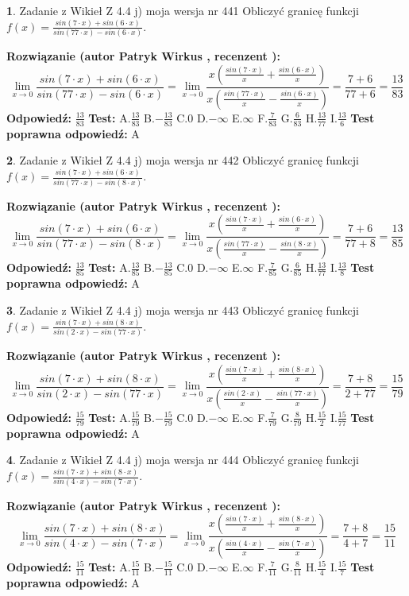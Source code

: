 \documentclass[12pt, a4paper]{article}
\theoremstyle{definition} %
\newtheorem{zad}{}
\newcommand{\zadStart}[1]{\begin{zad}#1\newline}
\newcommand{\zadStop}{\end{zad}}
\newcommand{\rozwStart}[2]{\noindent \textbf{Rozwiązanie (autor #1 , recenzent #2): }\newline}
\newcommand{\rozwStop}{\newline}
\newcommand{\odpStart}{\noindent \textbf{Odpowiedź:}\newline}
\newcommand{\odpStop}{\newline}
\newcommand{\testStart}{\noindent \textbf{Test:}\newline}
\newcommand{\testStop}{\newline}
\newcommand{\kluczStart}{\noindent \textbf{Test poprawna odpowiedź:}\newline}
\newcommand{\kluczStop}{\newline}
\begin{document}
\zadStart{Zadanie z Wikieł Z 4.4 j) moja wersja nr 441}
Obliczyć granicę funkcji $f(x)=\frac{sin(7\cdot x) +sin(6\cdot x)}{sin(77\cdot x) -sin(6\cdot x)}$.
\zadStop
\rozwStart{Patryk Wirkus}{}
$$\lim\limits_{x\to 0}\frac{sin(7\cdot x) +sin(6\cdot x)}{sin(77\cdot x) -sin(6\cdot x)}=\lim\limits_{x\to 0}\frac{x(\frac{sin(7\cdot x)}{x}+\frac{sin(6\cdot x)}{x})}{x(\frac{sin(77\cdot x)}{x}-\frac{sin(6\cdot x)}{x})}=\frac{7+6}{77+6} = \frac{13}{83}$$
\rozwStop
\odpStart
$\frac{13}{83}$
\odpStop
\testStart
A.$\frac{13}{83}$
B.$-\frac{13}{83}$
C.$0$
D.$-\infty$
E.$\infty$
F.$\frac{7}{83}$
G.$\frac{6}{83}$
H.$\frac{13}{77}$
I.$\frac{13}{6}$
\testStop
\kluczStart
A
\kluczStop



\zadStart{Zadanie z Wikieł Z 4.4 j) moja wersja nr 442}
Obliczyć granicę funkcji $f(x)=\frac{sin(7\cdot x) +sin(6\cdot x)}{sin(77\cdot x) -sin(8\cdot x)}$.
\zadStop
\rozwStart{Patryk Wirkus}{}
$$\lim\limits_{x\to 0}\frac{sin(7\cdot x) +sin(6\cdot x)}{sin(77\cdot x) -sin(8\cdot x)}=\lim\limits_{x\to 0}\frac{x(\frac{sin(7\cdot x)}{x}+\frac{sin(6\cdot x)}{x})}{x(\frac{sin(77\cdot x)}{x}-\frac{sin(8\cdot x)}{x})}=\frac{7+6}{77+8} = \frac{13}{85}$$
\rozwStop
\odpStart
$\frac{13}{85}$
\odpStop
\testStart
A.$\frac{13}{85}$
B.$-\frac{13}{85}$
C.$0$
D.$-\infty$
E.$\infty$
F.$\frac{7}{85}$
G.$\frac{6}{85}$
H.$\frac{13}{77}$
I.$\frac{13}{8}$
\testStop
\kluczStart
A
\kluczStop



\zadStart{Zadanie z Wikieł Z 4.4 j) moja wersja nr 443}
Obliczyć granicę funkcji $f(x)=\frac{sin(7\cdot x) +sin(8\cdot x)}{sin(2\cdot x) -sin(77\cdot x)}$.
\zadStop
\rozwStart{Patryk Wirkus}{}
$$\lim\limits_{x\to 0}\frac{sin(7\cdot x) +sin(8\cdot x)}{sin(2\cdot x) -sin(77\cdot x)}=\lim\limits_{x\to 0}\frac{x(\frac{sin(7\cdot x)}{x}+\frac{sin(8\cdot x)}{x})}{x(\frac{sin(2\cdot x)}{x}-\frac{sin(77\cdot x)}{x})}=\frac{7+8}{2+77} = \frac{15}{79}$$
\rozwStop
\odpStart
$\frac{15}{79}$
\odpStop
\testStart
A.$\frac{15}{79}$
B.$-\frac{15}{79}$
C.$0$
D.$-\infty$
E.$\infty$
F.$\frac{7}{79}$
G.$\frac{8}{79}$
H.$\frac{15}{2}$
I.$\frac{15}{77}$
\testStop
\kluczStart
A
\kluczStop



\zadStart{Zadanie z Wikieł Z 4.4 j) moja wersja nr 444}
Obliczyć granicę funkcji $f(x)=\frac{sin(7\cdot x) +sin(8\cdot x)}{sin(4\cdot x) -sin(7\cdot x)}$.
\zadStop
\rozwStart{Patryk Wirkus}{}
$$\lim\limits_{x\to 0}\frac{sin(7\cdot x) +sin(8\cdot x)}{sin(4\cdot x) -sin(7\cdot x)}=\lim\limits_{x\to 0}\frac{x(\frac{sin(7\cdot x)}{x}+\frac{sin(8\cdot x)}{x})}{x(\frac{sin(4\cdot x)}{x}-\frac{sin(7\cdot x)}{x})}=\frac{7+8}{4+7} = \frac{15}{11}$$
\rozwStop
\odpStart
$\frac{15}{11}$
\odpStop
\testStart
A.$\frac{15}{11}$
B.$-\frac{15}{11}$
C.$0$
D.$-\infty$
E.$\infty$
F.$\frac{7}{11}$
G.$\frac{8}{11}$
H.$\frac{15}{4}$
I.$\frac{15}{7}$
\testStop
\kluczStart
A
\kluczStop
\end{document}
